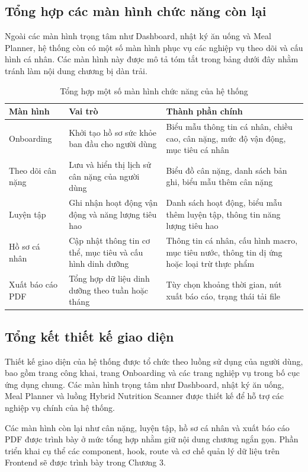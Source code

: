 \documentclass[12pt, a4paper]{report}
\begin{document}
\subsection{Tổng hợp các màn hình chức năng còn lại}Ngoài các màn hình trọng tâm như Dashboard, nhật ký ăn uống và Meal Planner, hệ thống còn có một số màn hình phục vụ các nghiệp vụ theo dõi và cấu hình cá nhân. Các màn hình này được mô tả tóm tắt trong bảng dưới đây nhằm tránh làm nội dung chương bị dàn trải.

\begin{table}[htbp]
\centering
\caption{Tổng hợp một số màn hình chức năng của hệ thống}
\begin{tabular}{|p{4cm}|p{4cm}|p{7cm}|}
\hline
\textbf{Màn hình} & \textbf{Vai trò} & \textbf{Thành phần chính} \\
\hline
Onboarding & Khởi tạo hồ sơ sức khỏe ban đầu cho người dùng & Biểu mẫu thông tin cá nhân, chiều cao, cân nặng, mức độ vận động, mục tiêu cá nhân \\
\hline
Theo dõi cân nặng & Lưu và hiển thị lịch sử cân nặng của người dùng & Biểu đồ cân nặng, danh sách bản ghi, biểu mẫu thêm cân nặng \\
\hline
Luyện tập & Ghi nhận hoạt động vận động và năng lượng tiêu hao & Danh sách hoạt động, biểu mẫu thêm luyện tập, thông tin năng lượng tiêu hao \\
\hline
Hồ sơ cá nhân & Cập nhật thông tin cơ thể, mục tiêu và cấu hình dinh dưỡng & Thông tin cá nhân, cấu hình macro, mục tiêu nước, thông tin dị ứng hoặc loại trừ thực phẩm \\
\hline
Xuất báo cáo PDF & Tổng hợp dữ liệu dinh dưỡng theo tuần hoặc tháng & Tùy chọn khoảng thời gian, nút xuất báo cáo, trạng thái tải file \\
\hline
\end{tabular}
\end{table}

\subsection{Tổng kết thiết kế giao diện}Thiết kế giao diện của hệ thống được tổ chức theo luồng sử dụng của người dùng, bao gồm trang công khai, trang Onboarding và các trang nghiệp vụ trong bố cục ứng dụng chung. Các màn hình trọng tâm như Dashboard, nhật ký ăn uống, Meal Planner và luồng Hybrid Nutrition Scanner được thiết kế để hỗ trợ các nghiệp vụ chính của hệ thống.

Các màn hình còn lại như cân nặng, luyện tập, hồ sơ cá nhân và xuất báo cáo PDF được trình bày ở mức tổng hợp nhằm giữ nội dung chương ngắn gọn. Phần triển khai cụ thể các component, hook, route và cơ chế quản lý dữ liệu trên Frontend sẽ được trình bày trong Chương 3.
\end{document}

